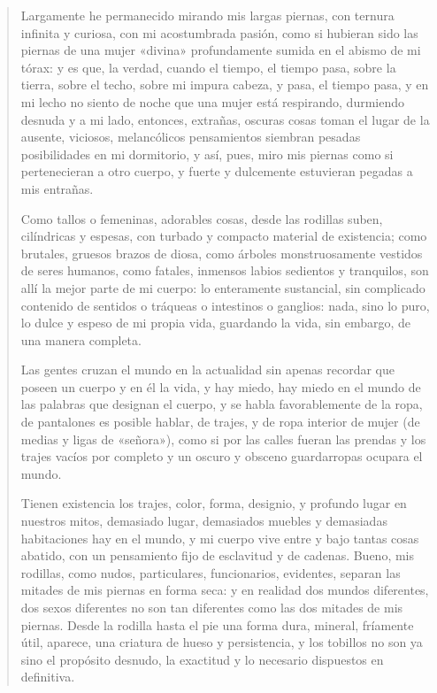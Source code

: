 \documentclass[12pt]{article}
\begin{document}
\clearpage
{}
\begin{verse}
Largamente he permanecido mirando mis largas piernas,  
con ternura infinita y curiosa, con mi acostumbrada pasión,  
como si hubieran sido las piernas de una mujer «divina»  
profundamente sumida en el abismo de mi tórax:  
y es que, la verdad, cuando el tiempo, el tiempo pasa,  
sobre la tierra, sobre el techo, sobre mi impura cabeza,  
y pasa, el tiempo pasa, y en mi lecho no siento de noche que una  
mujer está respirando, durmiendo desnuda y a mi lado,  
entonces, extrañas, oscuras cosas toman el lugar de la ausente,  
viciosos, melancólicos pensamientos  
siembran pesadas posibilidades en mi dormitorio,  
y así, pues, miro mis piernas como si pertenecieran a otro cuerpo,  
y fuerte y dulcemente estuvieran pegadas a mis entrañas.  
	
Como tallos o femeninas, adorables cosas,  
desde las rodillas suben, cilíndricas y espesas,  
con turbado y compacto material de existencia;  
como brutales, gruesos brazos de diosa,  
como árboles monstruosamente vestidos de seres humanos,  
como fatales, inmensos labios sedientos y tranquilos,  
son allí la mejor parte de mi cuerpo:  
lo enteramente sustancial, sin complicado contenido  
de sentidos o tráqueas o intestinos o ganglios:  
nada, sino lo puro, lo dulce y espeso de mi propia vida,  
guardando la vida, sin embargo, de una manera completa.  
	
Las gentes cruzan el mundo en la actualidad  
sin apenas recordar que poseen un cuerpo y en él la vida,  
y hay miedo, hay miedo en el mundo de las palabras que designan el cuerpo,  
y se habla favorablemente de la ropa,  
de pantalones es posible hablar, de trajes,  
y de ropa interior de mujer (de medias y ligas de «señora»),  
como si por las calles fueran las prendas y los trajes vacíos por completo  
y un oscuro y obsceno guardarropas ocupara el mundo.  
	
Tienen existencia los trajes, color, forma, designio,  
y profundo lugar en nuestros mitos, demasiado lugar,  
demasiados muebles y demasiadas habitaciones hay en el mundo,  
y mi cuerpo vive entre y bajo tantas cosas abatido,  
con un pensamiento fijo de esclavitud y de cadenas.  
Bueno, mis rodillas, como nudos,  
particulares, funcionarios, evidentes,  
separan las mitades de mis piernas en forma seca:  
y en realidad dos mundos diferentes, dos sexos diferentes  
no son tan diferentes como las dos mitades de mis piernas.  
Desde la rodilla hasta el pie una forma dura,  
mineral, fríamente útil, aparece,  
una criatura de hueso y persistencia,  
y los tobillos no son ya sino el propósito desnudo,  
la exactitud y lo necesario dispuestos en definitiva.  
	

\end{verse}
\end{document}
